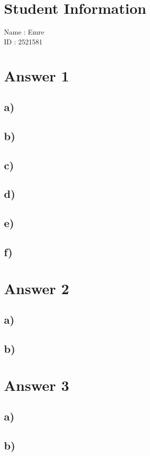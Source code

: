 \documentclass[12pt]{article}
\begin{document}
\section*{Student Information}

Name : Emre\\

ID : 2521581\\


\section*{Answer 1}
\subsection*{a)}
\subsection*{b)}
\subsection*{c)}
\subsection*{d)}
\subsection*{e)}
\subsection*{f)}

\section*{Answer 2}
\subsection*{a)}
\subsection*{b)}

\section*{Answer 3}
\subsection*{a)}
\subsection*{b)}
\end{document}
